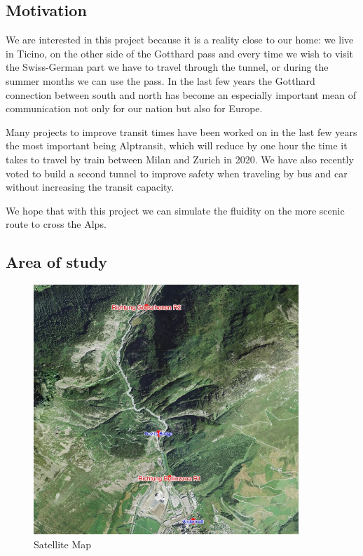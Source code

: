 \documentclass[11pt,a4paper,parskip=half-]{article}
\begin{document}
\subsection{Motivation}

We are interested in this project because it is a reality close to our home: we live in Ticino, on the other side of the Gotthard pass and every time we wish to visit the Swiss-German part we have to travel through the tunnel, or during the summer months we can use the pass. In the last few years the Gotthard connection between south and north has become an especially important mean of communication not only for our nation but also for Europe. 

Many projects to improve transit times have been worked on in the last few years the most important being Alptransit, which will reduce by one hour the time it takes to travel by train between Milan and Zurich in 2020. We have also recently voted to build a second tunnel to improve safety when traveling by bus and car without increasing the transit capacity. 

We hope that with this project we can simulate the fluidity on the more scenic route to cross the Alps.

\subsection{Area of study}

\begin{figure}
\vspace{-4mm}
\includegraphics[width=10cm]{Map}

\caption{Satellite Map}
\label{wrap-fig:Map}
\vspace*{-3cm}
\end{figure}
\end{document}
